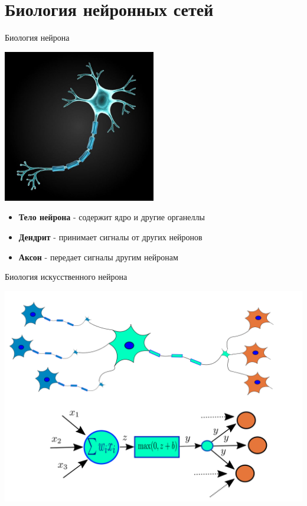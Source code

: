 \documentclass{beamer}
\begin{document}
\section{Биология нейронных сетей}
\begin{frame}{Биология нейрона}

\begin{center}
\includegraphics[width=0.5\textwidth]{img/neyron.jpg}
\end{center}
\begin{itemize}
            \item \textbf{Тело нейрона} - содержит ядро и другие органеллы
            \item \textbf{Дендрит}  - принимает сигналы от других нейронов
            \item \textbf{Аксон}  - передает сигналы другим нейронам
        \end{itemize}
\end{frame}
\begin{frame}{Биология искусственного нейрона}
\begin{center}
\includegraphics[width=1.0\textwidth]{img/schema.png}
\end{center}
\end{frame}
\end{document}
